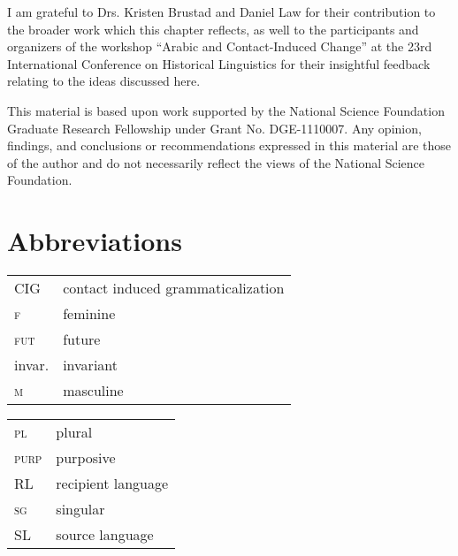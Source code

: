 \documentclass[output=paper]{langsci/langscibook}
\begin{document}
I am grateful to Drs. Kristen Brustad and Daniel Law for their contribution to the broader work which this chapter reflects, as well to the participants and organizers of the workshop “Arabic and Contact-Induced Change” at the 23rd International Conference on Historical Linguistics for their insightful feedback relating to the ideas discussed here.

This material is based upon work supported by the National Science Foundation Graduate Research Fellowship under Grant No. DGE-1110007. Any opinion, findings, and conclusions or recommendations expressed in this material are those of the author and do not necessarily reflect the views of the National Science Foundation.

\section*{Abbreviations}


\begin{tabularx}{.5\textwidth}{@{}lQ@{}}
CIG & contact induced grammaticalization \\
\textsc{f} & feminine \\
\textsc{fut} & future \\
invar. & invariant \\
\textsc{m} & masculine \\
\end{tabularx}%
\begin{tabularx}{.5\textwidth}{@{}lQ@{}}
\textsc{pl} & plural \\
\textsc{purp} & purposive \\
RL & recipient language \\
\textsc{sg} & singular \\
SL & source language \\
\end{tabularx}%



\sloppy
\printbibliography[heading=subbibliography,notkeyword=this] 
\end{document}
